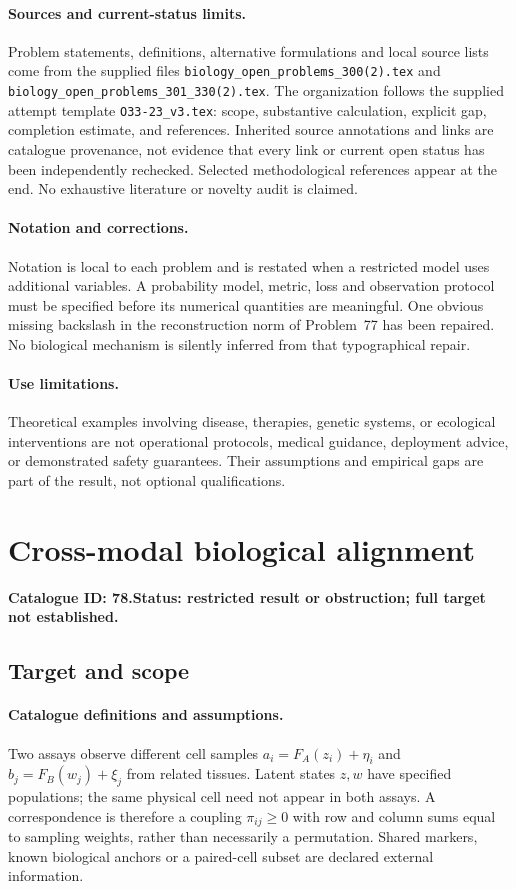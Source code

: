 \documentclass[11pt]{article}
\begin{document}
\paragraph{Sources and current-status limits.}
Problem statements, definitions, alternative formulations and local source lists
come from the supplied files
\texttt{biology\_open\_problems\_300(2).tex} and
\texttt{biology\_open\_problems\_301\_330(2).tex}.
The organization follows the supplied attempt template
\texttt{O33-23\_v3.tex}: scope, substantive calculation, explicit gap,
completion estimate, and references. Inherited source annotations and links are
catalogue provenance, not evidence that every link or current open status has
been independently rechecked. Selected methodological references appear at the
end. No exhaustive literature or novelty audit is claimed.

\paragraph{Notation and corrections.}
Notation is local to each problem and is restated when a restricted model uses
additional variables. A probability model, metric, loss and observation protocol
must be specified before its numerical quantities are meaningful. One obvious
missing backslash in the reconstruction norm of Problem~77 has been repaired.
No biological mechanism is silently inferred from that typographical repair.

\paragraph{Use limitations.}
Theoretical examples involving disease, therapies, genetic systems, or ecological
interventions are not operational protocols, medical guidance, deployment advice,
or demonstrated safety guarantees. Their assumptions and empirical gaps are part
of the result, not optional qualifications.

\setcounter{section}{77}
\section{Cross-modal biological alignment}
\label{prob:078}
\noindent\textbf{Catalogue ID: 78.}\quad \textbf{Status: restricted result or obstruction; full target not established.}
\subsection{Target and scope}
\paragraph{Catalogue definitions and assumptions.}
Two assays observe different cell samples $a_i=F_A(z_i)+\eta_i$ and $b_j=F_B(w_j)+\xi_j$ from related tissues. Latent states $z,w$ have specified populations; the same physical cell need not appear in both assays. A correspondence is therefore a coupling $\pi_{ij}\ge0$ with row and column sums equal to sampling weights, rather than necessarily a permutation. Shared markers, known biological anchors or a paired-cell subset are declared external information.
\end{document}
